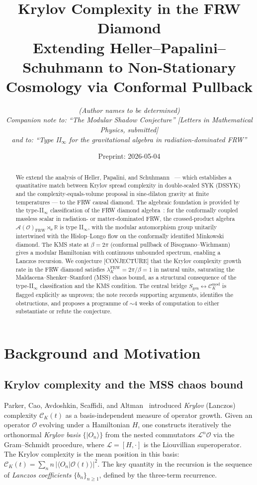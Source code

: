 \documentclass[12pt,a4paper]{article}
\title{\textbf{Krylov Complexity in the FRW Diamond}\\[4pt]
       \large Extending Heller--Papalini--Schuhmann to Non-Stationary Cosmology
       via Conformal Pullback}
\author{\textit{(Author names to be determined)}\\[2pt]
  \small \textit{Companion note to: ``The Modular Shadow Conjecture''
  [Letters in Mathematical Physics, submitted]}\\
  \small \textit{and to: ``Type II$_\infty$ for the gravitational algebra in
  radiation-dominated FRW'' \cite{FRWnote}}}
\date{Preprint: 2026-05-04}
\theoremstyle{definition}
\newcommand{\CK}{\mathcal{C}_K}
\newcommand{\lK}{\lambda_K}
\newcommand{\FRW}{\mathrm{FRW}}
\newcommand{\sgen}{S_{\mathrm{gen}}}
\newcommand{\Smod}{\mathcal{C}_K^{\mathrm{mod}}}
\begin{document}
\maketitle

\begin{abstract}
We extend the analysis of Heller, Papalini, and Schuhmann~\cite{HPS2024}
--- which establishes a quantitative match between Krylov spread complexity
in double-scaled SYK (DSSYK) and the complexity-equals-volume proposal in
sine-dilaton gravity at finite temperatures --- to the FRW causal diamond.
The algebraic foundation is provided by the type-II$_\infty$ classification
of the FRW diamond algebra~\cite{FRWnote}: for the conformally coupled
massless scalar in radiation- or matter-dominated FRW, the crossed-product
algebra $\mathcal{A}(\mathcal{O})_\FRW \rtimes_\sigma \mathbb{R}$ is type
II$_\infty$, with the modular automorphism group unitarily intertwined with
the Hislop--Longo flow on the conformally identified Minkowski diamond.
The KMS state at $\beta = 2\pi$ (conformal pullback of Bisognano--Wichmann)
gives a modular Hamiltonian with continuous unbounded spectrum, enabling
a Lanczos recursion.
We conjecture [CONJECTURE] that the Krylov complexity growth rate in the
FRW diamond satisfies $\lK^\FRW = 2\pi/\beta = 1$ in natural units,
saturating the Maldacena--Shenker--Stanford (MSS) chaos bound, as a
structural consequence of the type-II$_\infty$ classification and the
KMS condition.
The central bridge $\sgen \leftrightarrow \Smod$ is flagged explicitly
as unproven; the note records supporting arguments, identifies the obstructions,
and proposes a programme of $\sim 4$ weeks of computation to either
substantiate or refute the conjecture.
\end{abstract}

\tableofcontents

\section{Background and Motivation}
\label{sec:background}

\subsection{Krylov complexity and the MSS chaos bound}

Parker, Cao, Avdoshkin, Scaffidi, and Altman~\cite{Parker2019}
introduced \emph{Krylov} (Lanczos) complexity $\CK(t)$ as a
basis-independent measure of operator growth.
Given an operator $\mathcal{O}$ evolving under a Hamiltonian $H$,
one constructs iteratively the orthonormal \emph{Krylov basis}
$\{|O_n\rangle\}$ from the nested commutators $\mathcal{L}^n\mathcal{O}$
via the Gram--Schmidt procedure, where $\mathcal{L} = [H, \cdot]$ is the
Liouvillian superoperator.
The Krylov complexity is the mean position in this basis:
$\CK(t) = \sum_n n \, |\langle O_n | \mathcal{O}(t)\rangle|^2$.
The key quantity in the recursion is the sequence of \emph{Lanczos
coefficients} $\{b_n\}_{n \ge 1}$, defined by the three-term recurrence.
\end{document}
